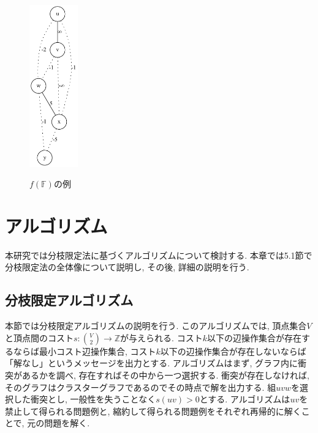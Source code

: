 \documentclass[10.5,a4paper,titlepage, dvipdfmx]{bxjsarticle}
\begin{document}
\begin{figure}[H]
\begin{minipage}{0.48\hsize}
        \label{fig:right-center}
    \end{minipage}
    \begin{minipage}{0.48\hsize}
        \centering
        \includegraphics[height=7cm]{f04.png}
        \label{fig:right}
    \end{minipage}
    \caption{$f(\mathbb{F})$の例}
    \label{fig:left_right}
\end{figure}

\clearpage


\section{アルゴリズム}
本研究では分枝限定法に基づくアルゴリズムについて検討する.
本章では5.1節で分枝限定法の全体像について説明し, その後, 詳細の説明を行う.


\subsection{分枝限定アルゴリズム}
本節では分枝限定アルゴリズムの説明を行う.
このアルゴリズムでは, 頂点集合$V$と頂点間のコスト$s:\binom{V}{2}\rightarrow\mathbb{Z}$が与えられる.
コスト$k$以下の辺操作集合が存在するならば最小コスト辺操作集合, コスト$k$以下の辺操作集合が存在しないならば「解なし」というメッセージを出力とする.
アルゴリズムはまず, グラフ内に衝突があるかを調べ, 存在すればその中から一つ選択する.
衝突が存在しなければ, そのグラフはクラスターグラフであるのでその時点で解を出力する.
組$uvw$を選択した衝突とし, 一般性を失うことなく$s(uv) > 0$とする.
アルゴリズムは$uv$を禁止して得られる問題例と, 縮約して得られる問題例をそれぞれ再帰的に解くことで, 元の問題を解く.
\end{document}
